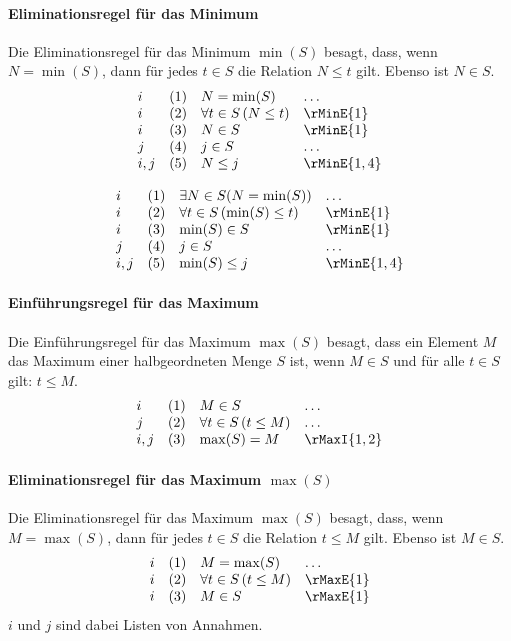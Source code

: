 \documentclass[main.tex]{subfiles}
\begin{document}
\paragraph{Eliminationsregel für das Minimum}
Die Eliminationsregel für das Minimum \(\min(S)\) besagt, dass, wenn \(N = \min(S)\), dann für jedes \(t \in S\) die Relation \(N \leq t\) gilt. Ebenso ist \(N \in S\).
\[
\begin{array}{llll}
    i & (1) & N = \min(S) & \dots \\
    i & (2) & \forall t \in S \, (N \leq t) & \rMinE{1} \\
    i & (3) & N \in S & \rMinE{1}\\
    j & (4) & j \in S & \hdots\\
    i,j & (5) & N\leq j & \rMinE{1,4}\\
\end{array}
\]

\[
\begin{array}{llll}
    i & (1) & \exists N\in S(N = \min(S)) & \dots \\
    i & (2) & \forall t \in S \, (\min(S) \leq t) & \rMinE{1} \\
    i & (3) & \min(S) \in S & \rMinE{1}\\
    j & (4) & j \in S & \hdots\\
    i,j & (5) & \min(S)\leq j & \rMinE{1,4}\\
\end{array}
\]

\paragraph{Einführungsregel für das Maximum}
Die Einführungsregel für das Maximum \(\max(S)\) besagt, dass ein Element \(M\) das Maximum einer halbgeordneten Menge \(S\) ist, wenn \(M \in S\) und für alle \(t \in S\) gilt: \(t \leq M\).
\[
\begin{array}{llll}
    i   & (1) & M \in S & \dots \\
    j   & (2) & \forall t \in S \, (t \leq M) & \dots \\
    i,j & (3) & \max(S) = M & \rMaxI{1,2}
\end{array}
\]

\paragraph{Eliminationsregel für das Maximum \(\max(S)\)}
Die Eliminationsregel für das Maximum \(\max(S)\) besagt, dass, wenn \(M = \max(S)\), dann für jedes \(t \in S\) die Relation \(t \leq M\) gilt. Ebenso ist \(M \in S\).
\[
\begin{array}{llll}
    i & (1) & M = \max(S) & \dots \\
    i & (2) & \forall t \in S \, (t \leq M) & \rMaxE{1} \\
    i & (3) & M \in S & \rMaxE{1}
\end{array}
\]
\(i\) und \(j\) sind dabei Listen von Annahmen.
\end{document}

